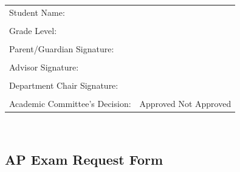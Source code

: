 \vfill
\noindent\hrulefill
\vspace{.5cm}

\renewcommand{\arraystretch}{1}
\noindent\begin{tabular}{ll}
Student Name: & \underline{\hspace{7cm}}\\
&\\
Grade Level:  & \underline{\hspace{7cm}}\\
&\\
Parent/Guardian Signature: & \underline{\hspace{7cm}}\\
&\\
Advisor Signature:  & \underline{\hspace{7cm}}\\
&\\
Department Chair Signature: &  \underline{\hspace{7cm}}\\
&\\
Academic Committee’s Decision:	& Approved  \hspace{.5cm} 	Not Approved
\end{tabular}\\







\newpage

\subsection{AP Exam Request Form}

\vspace{1cm}

